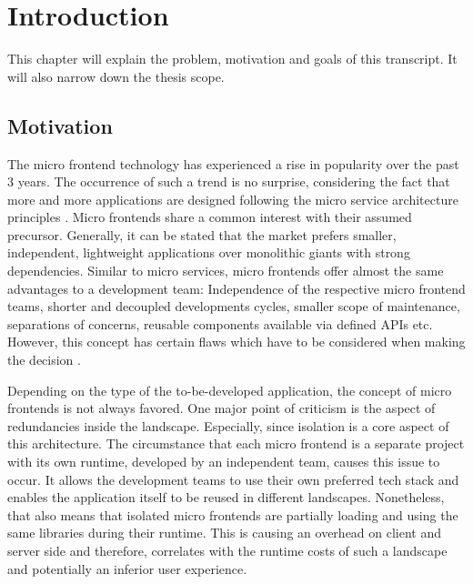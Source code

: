 \chapter{Introduction} %
\label{Chapter1}


This chapter will explain the problem, motivation and goals of this transcript. 
It will also narrow down the thesis scope.

\section{Motivation}

The micro frontend technology has experienced a rise in popularity over the past 3 years. The occurrence of such a trend is no surprise, considering the fact that more and more applications are designed following the micro service architecture principles \cite{top_6_frontend_trends}.
Micro frontends share a common interest with their assumed precursor. Generally, it can be stated that the market prefers smaller, independent, lightweight applications over monolithic giants with strong dependencies. Similar to micro services, micro frontends offer almost the same advantages to a development team: Independence of the respective micro frontend teams, shorter and decoupled developments cycles, smaller scope of maintenance, separations of concerns, reusable components available via defined APIs etc.\cite{advantages_of_mfes} However, this concept has certain flaws which have to be considered when making the decision \cite{Yang_2019}.

Depending on the type of the to-be-developed application, the concept of micro frontends is not always favored. One major point of criticism is the aspect of redundancies inside the landscape. Especially, since isolation is a core aspect of this architecture. The circumstance that each micro frontend is a separate project with its own runtime, developed by an independent team, causes this issue to occur. It allows the development teams to use their own preferred tech stack and enables the application itself to be reused in different landscapes. Nonetheless, that also means that isolated micro frontends are partially loading and using the same libraries during their runtime. This is causing an overhead on client and server side and therefore, correlates with the runtime costs of such a landscape and potentially an inferior user experience.\cite{motivation_benefits_adopting_MFs}\cite{micro_frontends_in_general}

